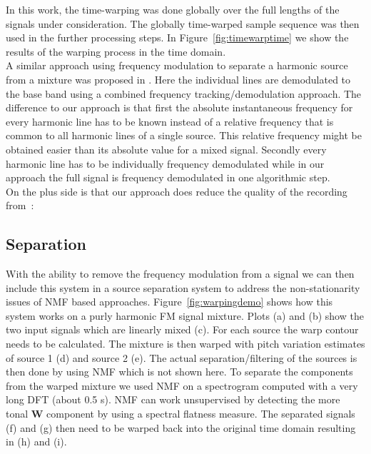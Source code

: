 In this work, the time-warping was done globally over the full lengths of the
signals under consideration. The globally time-warped sample sequence
was then used in the further processing steps. In Figure~\ref{fig:timewarptime} we show the results of the warping process in the time domain. \\

A similar approach using frequency modulation to separate a harmonic
source from a mixture was proposed in \cite{wang95}. Here the
individual lines are demodulated to the base band using a combined frequency
tracking/demodulation approach. The difference to our approach is that first
the absolute instantaneous frequency for every harmonic line has to be known
instead of a relative frequency that is common to all harmonic lines of a single
source. This relative frequency might be obtained easier than its
absolute value for a mixed signal. Secondly every harmonic line has to be individually frequency demodulated while in our approach the full signal is frequency demodulated in one algorithmic step.\\

On the plus side is that our approach does reduce the quality of the recording
from~\cite{wang94}:

\subsection{Separation} %
\label{sub:pitch_variation_informed_source_separation}

With the ability to remove the frequency modulation from a signal we can then include this system in a source separation system to address the non-stationarity issues of NMF based approaches. Figure~\ref{fig:warpingdemo} shows how this system works on a purly harmonic FM signal mixture. Plots (a) and (b) show the two input signals which are linearly mixed (c). For each source the warp contour needs to be calculated. The mixture is then warped with pitch variation estimates of source 1  (d) and source 2 (e). The actual separation/filtering of the sources is then done by using NMF which is not shown here. To separate the components from the warped mixture we used NMF on a spectrogram computed with a very long DFT (about 0.5 s). NMF can work unsupervised by detecting the more tonal $\textbf{W}$ component by using a spectral flatness measure. The separated signals (f) and (g) then need to be warped back into the original time domain resulting in (h) and (i).

